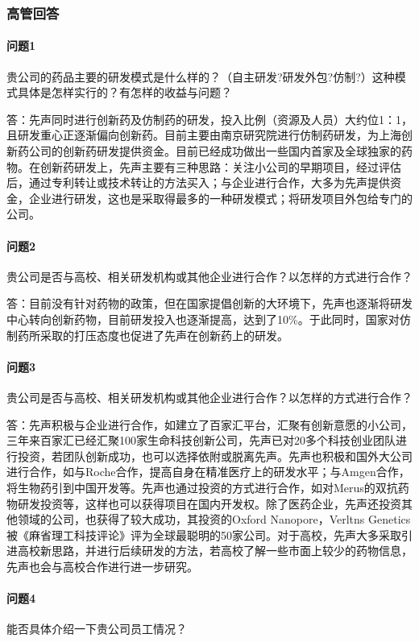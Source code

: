 \documentclass[twocolumn,openany]{ctexbook}
\begin{document}
	\subsubsection*{高管回答}
	
	\paragraph{问题1}贵公司的药品主要的研发模式是什么样的？（自主研发?研发外包?仿制?）这种模式具体是怎样实行的？有怎样的收益与问题？
	
	答：先声同时进行创新药及仿制药的研发，投入比例（资源及人员）大约位1：1，且研发重心正逐渐偏向创新药。目前主要由南京研究院进行仿制药研发，为上海创新药公司的创新药研发提供资金。目前已经成功做出一些国内首家及全球独家的药物。在创新药研发上，先声主要有三种思路：关注小公司的早期项目，经过评估后，通过专利转让或技术转让的方法买入；与企业进行合作，大多为先声提供资金，企业进行研发，这也是采取得最多的一种研发模式；将研发项目外包给专门的公司。
	
	\paragraph{问题2}贵公司是否与高校、相关研发机构或其他企业进行合作？以怎样的方式进行合作？
	
	答：目前没有针对药物的政策，但在国家提倡创新的大环境下，先声也逐渐将研发中心转向创新药物，目前研发投入也逐渐提高，达到了10\%。于此同时，国家对仿制药所采取的打压态度也促进了先声在创新药上的研发。
	
	\paragraph{问题3}贵公司是否与高校、相关研发机构或其他企业进行合作？以怎样的方式进行合作？
	
	答：先声积极与企业进行合作，如建立了百家汇平台，汇聚有创新意愿的小公司，三年来百家汇已经汇聚100家生命科技创新公司，先声已对20多个科技创业团队进行投资，若团队创新成功，也可以选择依附或脱离先声。先声也积极和国外大公司进行合作，如与Roche合作，提高自身在精准医疗上的研发水平；与Amgen合作，将生物药引到中国开发等。先声也通过投资的方式进行合作，如对Merus的双抗药物研发投资等，这样也可以获得项目在国内开发权。除了医药企业，先声还投资其他领域的公司，也获得了较大成功，其投资的Oxford Nanopore，Verltns Genetics被《麻省理工科技评论》评为全球最聪明的50家公司。对于高校，先声大多采取引进高校新思路，并进行后续研发的方法，若高校了解一些市面上较少的药物信息，先声也会与高校合作进行进一步研究。
	
	\paragraph{问题4}能否具体介绍一下贵公司员工情况？
	
\end{document}
